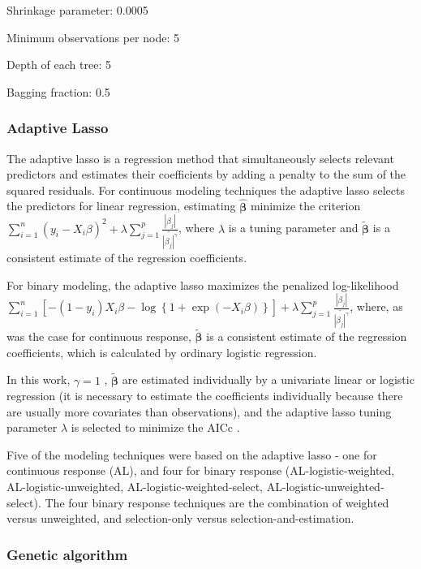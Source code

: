 \documentclass[english]{article}\usepackage[]{graphicx}\usepackage[]{color}
\numberwithin{equation}{section}
\numberwithin{figure}{section}
\renewcommand\[{\begin{equation}}
\renewcommand\]{\end{equation}}
\begin{document}
Shrinkage parameter: 0.0005

Minimum observations per node: 5

Depth of each tree: 5

Bagging fraction: 0.5


\subsubsection{Adaptive Lasso}

The adaptive lasso \citep{Zou-2006} is a regression method that simultaneously
selects relevant predictors and estimates their coefficients by adding
a penalty to the sum of the squared residuals. For continuous modeling
techniques the adaptive lasso selects the predictors for linear regression,
estimating $\hat{{\bm{\beta}}}$ minimize the criterion $\sum_{i=1}^{n}(y_{i}-X_{i}\beta)^{2}+\lambda\sum_{j=1}^{p}\frac{{|\beta_{j}|}}{\tilde{{|\beta_{j}|^{\gamma}}}}$,
where $\lambda$ is a tuning parameter and $\tilde{{\bm{\beta}}}$
is a consistent estimate of the regression coefficients.

For binary modeling, the adaptive lasso maximizes the penalized log-likelihood
$\sum_{i=1}^{n}\left[-\left(1-y_{i}\right)X_{i}\beta-\log\left\{ 1+\exp\left(-X_{i}\beta\right)\right\} \right]+\lambda\sum_{j=1}^{p}\frac{{|\beta_{j}|}}{\tilde{{|\beta_{j}|^{\gamma}}}}$,
where, as was the case for continuous response, $\tilde{\bm{\beta}}$
is a consistent estimate of the regression coefficients, which is
calculated by ordinary logistic regression.

In this work, $\gamma=1$ , $\tilde{{\bm{\beta}}}$ are estimated
individually by a univariate linear or logistic regression (it is
necessary to estimate the coefficients individually because there
are usually more covariates than observations), and the adaptive lasso
tuning parameter $\lambda$ is selected to minimize the AICc \citep{Hurvich-Simonoff-Tsai-1998}.

Five of the modeling techniques were based on the adaptive lasso -
one for continuous response (AL), and four for binary response (AL-logistic-weighted,
AL-logistic-unweighted, AL-logistic-weighted-select, AL-logistic-unweighted-select).
The four binary response techniques are the combination of weighted
versus unweighted, and selection-only versus selection-and-estimation.


\subsubsection{Genetic algorithm}
\end{document}
